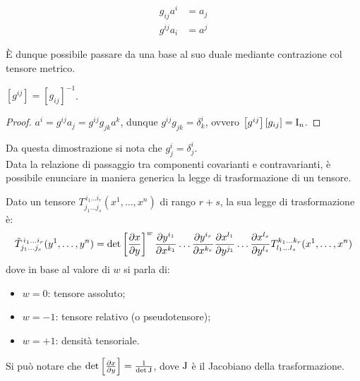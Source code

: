 \begin{equation}
	\begin{split}
		g_{ij} a^i &= a_j \\
		g^{ij} a_i &= a^j
	\end{split}
	\label{eq:12}
\end{equation}

È dunque possibile passare da una base al suo duale mediante contrazione col tensore metrico.

\begin{proposition}
	$ \left[g^{ij}\right] = \left[g_{ij}\right]^{-1} $.
\end{proposition}
\begin{proof}
	$ a^i = g^{ij} a_j = g^{ij} g_{jk} a^k $, dunque $ g^{ij} g_{jk} = \delta^i_k $, ovvero $ \left[g^{ij}\right]\left[g_{ij}\right] = \mathbf{\text{I}}_n $.
\end{proof}

Da questa dimostrazione si nota che $ g^i_j = \delta^i_j $.\\
Data la relazione di passaggio tra componenti covarianti e contravarianti, è possibile enunciare in maniera generica la legge di trasformazione di un tensore.

\begin{definition}
	Dato un tensore $ T^{\,i_1 \dots i_r}_{j_1 \dots j_s} (x^1, \dots, x^n) $ di rango $ r+s $, la sua legge di trasformazione è:
	\begin{equation}
		\tilde{T}^{\,i_1 \dots i_r}_{j_1 \dots j_s} (y^1, \dots, y^n) = \det\left[\frac{\partial x}{\partial y}\right]^w \frac{\partial y^{i_1}}{\partial x^{k_1}} \dots \frac{\partial y^{i_r}}{\partial x^{k_r}} \frac{\partial x^{l_1}}{\partial y^{j_1}} \dots \frac{\partial x^{l_s}}{\partial y^{l_s}} T^{k_1 \dots k_r}_{l_1 \dots l_s} (x^1, \dots, x^n)
		\label{eq:13}
	\end{equation}
	dove in base al valore di $ w $ si parla di:
	\begin{itemize}
		\item $ w = 0 $: tensore assoluto;
		\item $ w = -1 $: tensore relativo (o pseudotensore);
		\item $ w = +1 $: densità tensoriale.
	\end{itemize}
\end{definition}

Si può notare che $ \det\left[\frac{\partial x}{\partial y}\right] = \frac{1}{\det\mathbf{\text{J}}} $, dove $ \mathbf{\text{J}} $ è il Jacobiano della trasformazione.











